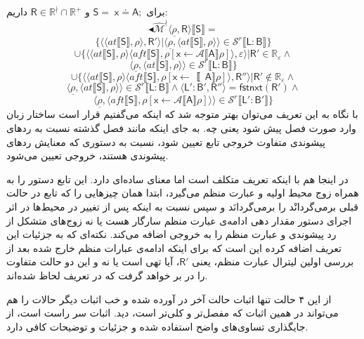 برای $\mathsf{S=\;x \doteq A;}$ و $\mathsf{R} \in \mathbb{R^\nmid} \cap \mathbb{R^+}$ داریم:
$$\blacktriangleleft\mathcal{\hat{M}^\nmid} \langle \underline{\rho}, \mathsf{R} \rangle \llbracket \mathsf{S} \rrbracket
=$$
$$\{
\langle \langle at \llbracket \mathsf{S} \rrbracket, \rho \rangle , \mathsf{R'} \rangle |
\langle \underline{\rho}, \langle at \llbracket \mathsf{S} \rrbracket, \rho \rangle \rangle \in \mathcal{S}^r \llbracket \mathsf{L:B} \rrbracket \}$$
$$\cup \{ \langle \langle at \llbracket \mathsf{S} \rrbracket , \rho \rangle  \langle aft \llbracket \mathsf{S} \rrbracket, 
\rho [\mathsf{x}\leftarrow \mathcal{A}\llbracket \mathsf{A} \rrbracket \rho ]\rangle , \varepsilon \rangle | \mathsf{R'} \in \mathbb{R_\varepsilon} \land$$
$$
\langle \underline{\rho}, \langle at \llbracket \mathsf{S} \rrbracket , \rho \rangle \rangle \in 
\mathcal{S}^r \llbracket \mathsf{L:B} \rrbracket
\}$$
$$\cup \{
\langle \langle at \llbracket \mathsf{S} \rrbracket , \rho \rangle \langle aft \llbracket \mathsf{S} \rrbracket , \rho [\mathsf{x} \leftarrow \mathcal \llbracket \mathsf{A}\rrbracket \rho]\rangle, \mathsf{R''}\rangle | \mathsf{R'} \notin \mathbb{R_\varepsilon} \land$$
$$\langle \underline{\rho},\langle at \llbracket \mathsf{S} \rrbracket , \rho \rangle \rangle \in \mathcal{S}^r \llbracket \mathsf{L:B} \rrbracket \land \langle \mathsf{L':B',R''} \rangle = 
\mathsf{fstnxt(R') }\land$$
$$\langle \underline{\rho}, \langle aft \llbracket \mathsf{S} \rrbracket,\rho 
[\mathsf{x} \leftarrow \mathcal{A}\llbracket \mathsf{A} \rrbracket \rho]\rangle \rangle \in 
\mathcal{S}^r \llbracket \mathsf{L':B'} \rrbracket
\}$$
با نگاه به این تعریف می‌توان بهتر متوجه شد که اینکه می‌گفتیم قرار است ساختار زبان وارد صورت فصل پیش شود یعنی چه. به جای اینکه مانند فصل گذشته نسبت به ردهای پیشوندی متفاوت خروجی تابع تعیین شود، نسبت به دستوری که معنایش ردهای پیشوندی هستند، خروجی تعیین می‌شود. 

در اینجا هم با اینکه تعریف متکلف است اما معنای ساده‌ای دارد. این تابع دستور را به همراه زوج محیط اولیه و عبارت منظم می‌گیرد، ابتدا همان چیزهایی را که تابع در حالت قبلی برمی‌گردانْد را برمی‌گردانَد و سپس نسبت به اینکه پس از تغییر در محیط‌ها در اثر اجرای دستور مقدار دهی ادامه‌ی عبارت منظم سارگار هست یا نه زوج‌های متشکل از رد پیشوندی و عبارت منظم را به خروجی اضافه می‌کند. نکته‌ای که به جزئیات این تعریف اضافه کرده این است که برای اینکه ادامه‌ی عبارات منظم خارج شده بعد از بررسی اولین لیترال عبارت منظم، یعنی $\mathsf{R'}$،  آیا تهی است یا نه و این دو حالت متفاوت را در بر خواهد گرفت که در تعریف لحاظ شده‌اند.

از این ۴ حالت تنها اثبات حالت آخر در \cite{calcul} آورده شده و خب اثبات دیگر حالات را هم می‌تواند در همین اثبات که مفصل‌تر و کلی‌تر است، دید. اثبات سر راست است، از جایگذاری تساوی‌های واضح استفاده شده و جزئیات و توضیحات کافی دارد.

